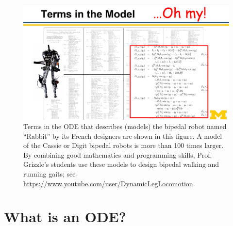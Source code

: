    \begin{figure}[hbt!]%
	\centering
\includegraphics[width=0.99\columnwidth]{graphics/Chap09/RabbitBigModel.png}
    \caption[]{Terms in the ODE that describes (models) the bipedal robot named ``Rabbit'' by its French designers are shown in this figure. A model of the Cassie or Digit bipedal robots is more than 100 times larger. By combining good mathematics and programming skills, Prof. Grizzle's students use these models to design bipedal walking and running gaits; see \url{https://www.youtube.com/user/DynamicLegLocomotion}.}
    \label{fig:RabbitBigModel}
\end{figure}

 \section{What is an ODE?}

